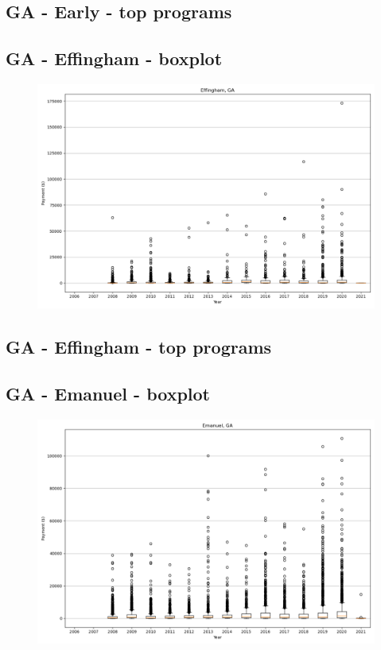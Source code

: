 \subsection*{GA - Early - top programs}

\newpage
\subsection*{GA - Effingham - boxplot}
\begin{figure}[h]
\centering
\includegraphics[width=7in]{../output/boxplots/counties/Effingham-GA_boxplot.png}
\end{figure}


\subsection*{GA - Effingham - top programs}

\newpage
\subsection*{GA - Emanuel - boxplot}
\begin{figure}[h]
\centering
\includegraphics[width=7in]{../output/boxplots/counties/Emanuel-GA_boxplot.png}
\end{figure}



